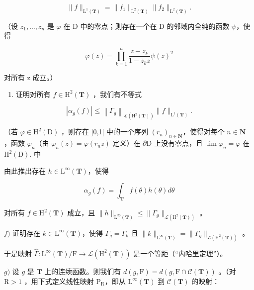 \[
\| f \| _ {\mathrm{L} ^ {1} (\mathbf {T})} = \| f _ {1} \| _ {\mathrm{L} ^ {2} (\mathbf {T})} \| f _ {2} \| _ {\mathrm{L} ^ {2} (\mathbf {T})}.
\]

（设 \(z_{1},\ldots,z_{n}\) 是 \(\varphi\) 在 D 中的零点；则存在一个在 D 的邻域内全纯的函数 \(\psi\)，使得

\[
\varphi (z) = \prod_ {k = 1} ^ {n} \frac {z - z _ {k}}{1 - \overline {{z}} _ {k} z} \psi (z) ^ {2}
\]

对所有 z 成立。）

\begin{enumerate}
\def\labelenumi{\alph{enumi})}
\setcounter{enumi}{4}
\tightlist
\item
  证明对所有 \(f \in \mathrm{H}^{2}(\mathbf{T})\) ，我们有不等式
\end{enumerate}

\[
\left| \alpha_ {g} (f) \right| \leqslant \left\| \Gamma_ {g} \right\| _ {\mathscr {L} \left(\mathrm{H} ^ {2} (\mathbf {T})\right)} \| f \| _ {\mathrm{L} ^ {1} (\mathbf {T})}.
\]

（若 \(\varphi \in \mathrm{H}^2 (\mathrm{D})\) ，则存在 ]0,1[ 中的一个序列 \((r_n)_{n\in \mathbf{N}}\)，使得对每个 \(n\in \mathbf{N}\) ，函数 \(\varphi_{n}\)（由 \(\varphi_{n}(z) = \varphi (r_{n}z)\) 定义）在 \(\partial \mathrm{D}\) 上没有零点，且 \(\lim \varphi_n = \varphi\) 在 \(\mathrm{H}^2 (\mathrm{D}).\) 中

由此推出存在 \(h \in \mathrm{L}^{\infty}(\mathbf{T})\)，使得

\[
\alpha_ {g} (f) = \int_ {\mathbf {T}} f (\theta) h (\theta) d \theta
\]

对所有 \(f \in \mathrm{H}^2(\mathbf{T})\) 成立，且 \(\|h\|_{\mathrm{L}^\infty(\mathbf{T})} \leqslant \| \Gamma_g \|_{\mathcal{L}(\mathrm{H}^2(\mathbf{T}))}\) 。

\(f)\) 证明存在 \(k \in \mathrm{L}^{\infty}(\mathbf{T})\)，使得 \(\Gamma_g = \Gamma_k\) 且 \(\| k \|_{\mathrm{L}^{\infty}(\mathbf{T})} = \| \Gamma_g \|_{\mathcal{L}(\mathrm{H}^2(\mathbf{T}))}\) 。

于是映射 \(\widehat{\Gamma}\colon\mathrm{L}^{\infty}(\mathbf{T})/\mathrm{F}\to\mathcal{L}(\mathrm{H}^{2}(\mathbf{T}))\) 是一个等距（“内哈里定理”）。

\(g)\) 设 \(g\) 是 \(\mathbf{T}\) 上的连续函数。则我们有 \(d(g, \mathrm{F}) = d(g, \mathrm{F} \cap \mathcal{C}(\mathbf{T}))\) 。（对 \(\mathrm{R} > 1\) ，用下式定义线性映射 \(\mathrm{P}_{\mathrm{R}}\)，即从 \(\mathrm{L}^{\infty}(\mathbf{T})\) 到 \(\mathcal{C}(\mathbf{T})\) 的映射：

